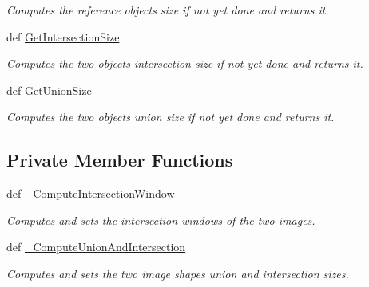 \begin{DoxyCompactItemize}
\begin{DoxyCompactList}\small\item\em Computes the reference objects size if not yet done and returns it. \end{DoxyCompactList}\item 
\hypertarget{classmedpy_1_1metric_1_1Volume_1_1Volume_a675fe69a77ee67b93da82af7f138deaa}{
def \hyperlink{classmedpy_1_1metric_1_1Volume_1_1Volume_a675fe69a77ee67b93da82af7f138deaa}{GetIntersectionSize}}
\label{classmedpy_1_1metric_1_1Volume_1_1Volume_a675fe69a77ee67b93da82af7f138deaa}

\begin{DoxyCompactList}\small\item\em Computes the two objects intersection size if not yet done and returns it. \end{DoxyCompactList}\item 
\hypertarget{classmedpy_1_1metric_1_1Volume_1_1Volume_a2ba55a81e112ad5b40fc7d8f58e71f0d}{
def \hyperlink{classmedpy_1_1metric_1_1Volume_1_1Volume_a2ba55a81e112ad5b40fc7d8f58e71f0d}{GetUnionSize}}
\label{classmedpy_1_1metric_1_1Volume_1_1Volume_a2ba55a81e112ad5b40fc7d8f58e71f0d}

\begin{DoxyCompactList}\small\item\em Computes the two objects union size if not yet done and returns it. \end{DoxyCompactList}\end{DoxyCompactItemize}
\subsection*{Private Member Functions}
\begin{DoxyCompactItemize}
\item 
def \hyperlink{classmedpy_1_1metric_1_1Volume_1_1Volume_a30566577c9f3e1812da2c0ecc1e9543b}{\_\-ComputeIntersectionWindow}
\begin{DoxyCompactList}\small\item\em Computes and sets the intersection windows of the two images. \end{DoxyCompactList}\item 
\hypertarget{classmedpy_1_1metric_1_1Volume_1_1Volume_a28099a18f703f77e073e35d336da6db5}{
def \hyperlink{classmedpy_1_1metric_1_1Volume_1_1Volume_a28099a18f703f77e073e35d336da6db5}{\_\-ComputeUnionAndIntersection}}
\label{classmedpy_1_1metric_1_1Volume_1_1Volume_a28099a18f703f77e073e35d336da6db5}

\begin{DoxyCompactList}\small\item\em Computes and sets the two image shapes union and intersection sizes. \end{DoxyCompactList}\end{DoxyCompactItemize}
